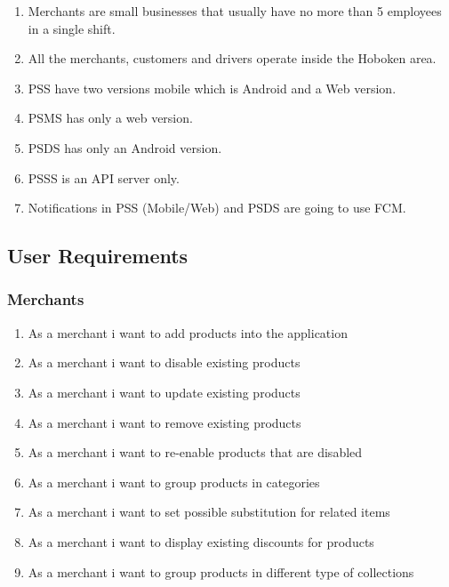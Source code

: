\begin{enumerate}[resume, label=AS-\arabic*]
    \item Merchants are small businesses that usually have no more 
    than 5 employees in a single shift.
    \item All the merchants, customers and drivers operate inside the 
    Hoboken area.
    \pagebreak
    \item PSS have two versions mobile which is Android and a Web version.
    \item PSMS has only a web version.
    \item PSDS has only an Android version.
    \item PSSS is an API server only.
    \item Notifications in PSS (Mobile/Web) and PSDS are going to use FCM.
\end{enumerate}



\pagebreak

\subsection{User Requirements}
\subsubsection{Merchants}
\begin{enumerate}[label=USR-\arabic*]
    \item As a merchant i want to add products into the application
    \item As a merchant i want to disable existing products
    \item As a merchant i want to update existing products
    \item As a merchant i want to remove existing products
    \item As a merchant i want to re-enable products that are disabled
    \item As a merchant i want to group products in categories
    \item As a merchant i want to set possible substitution for related items
    \item As a merchant i want to display existing discounts for products
    \item As a merchant i want to group products in different type of 
    collections
\end{enumerate}
